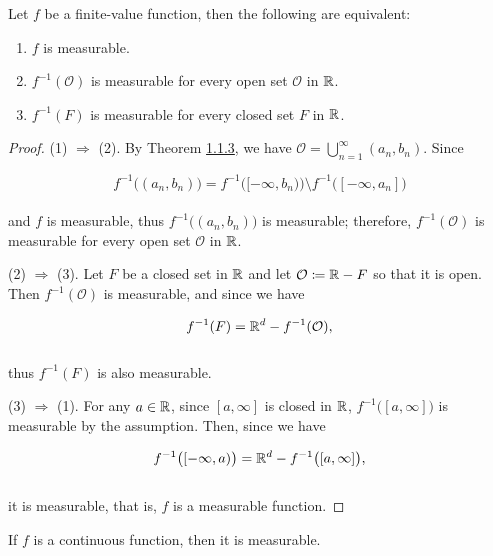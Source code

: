 \documentclass[12pt, a4paper, openany, twoside]{book}
\theoremstyle{definition}
\theoremstyle{remark}
\theoremstyle{plain}
\numberwithin{equation}{section}
\begin{document}
\vspace{5mm}
\begin{tcolorbox}[colback=yellow!10!white,colframe=red!75!black,title=Theorem 1.4.1]\label{Theorem 1.4.1}
    Let $f$ be a finite-value function, then the following are equivalent:
    \begin{enumerate}
        \item [(1)] $f$ is measurable.
        \item [(2)] $f^{-1}(\mathcal{O})$ is measurable for every open set $\mathcal{O}$ in ${\mathbb {R}}$.
        \item [(3)] $f^{-1}(F)$ is measurable for every closed set $F$ in ${\mathbb {R}}$.
    \end{enumerate}
\end{tcolorbox}
\begin{proof}
    (1) $\Rightarrow$ (2). By Theorem \hyperref[Theorem 1.1.3]{1.1.3}, we have $\mathcal{O}=\bigcup_{n=1}^{\infty}{(a_n,b_n)}$. Since

    \[f^{-1}\big((a_n,b_n)\big)=f^{-1}\big([-\infty,b_n)\big)\setminus f^{-1}\big([-\infty,a_n]\big)\]
    \\
    and $f$ is measurable, thus $f^{-1}\big((a_n,b_n)\big)$ is measurable; therefore, $f^{-1}(\mathcal{O})$ is measurable for every open set $\mathcal{O}$ in ${\mathbb {R}}$.

    \vspace{5mm}
    (2) $\Rightarrow$ (3). Let $F$ be a closed set in ${\mathbb {R}}$ and let $\mathcal{O}\coloneqq{\mathbb {R}}-F$ so that it is open. Then $f^{-1}(\mathcal{O})$ is measurable, and since we have

    \[f^{-1}(F)={\mathbb {R}}^d-f^{-1}(\mathcal{O}),\]
    \\
    thus $f^{-1}(F)$ is also measurable.

    \vspace{5mm}
    (3) $\Rightarrow$ (1). For any $a\in{\mathbb {R}}$, since $[a,\infty]$ is closed in ${\mathbb {R}}$, $f^{-1}\big([a,\infty]\big)$ is measurable by the assumption. Then, since we have

    \[f^{-1}\big([-\infty,a)\big)={\mathbb {R}}^d-f^{-1}\big([a,\infty]\big),\]
    \\
    it is measurable, that is, $f$ is a measurable function.
\end{proof}
\vspace{5mm}
\begin{tcolorbox}[colback=yellow!10!white,colframe=red!75!black,title=Corollary 1.4.2]\label{Corollary 1.4.2}
    If $f$ is a continuous function, then it is measurable.
\end{tcolorbox}
\end{document}
